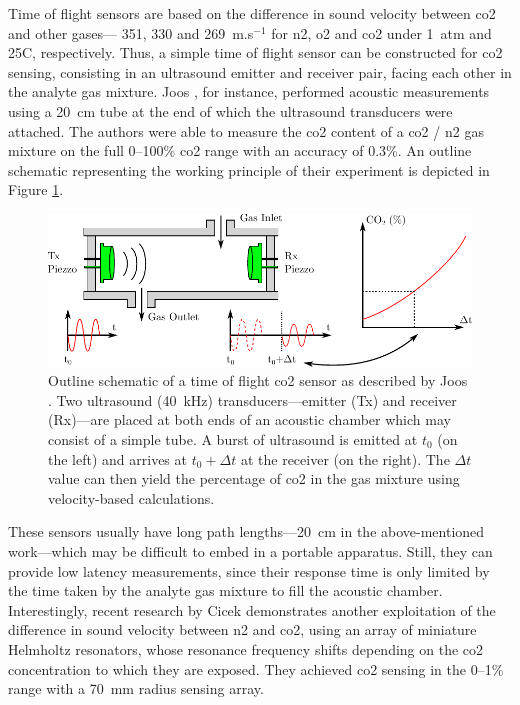 Time of flight sensors are based on the difference in sound velocity between \gls{co2} and other gases---\eg{} 351, 330 and 269~m.s$^{-1}$ for \gls{n2}, \gls{o2} and \gls{co2} under 1~atm and 25{\degree}C, respectively\cite{giacobbe1993}. Thus, a simple time of flight sensor can be constructed for \gls{co2} sensing, consisting in an ultrasound emitter and receiver pair, facing each other in the analyte gas mixture. Joos \etal{}\cite{joos1993}, for instance, performed acoustic measurements using a 20~cm tube at the end of which the ultrasound transducers were attached. The authors were able to measure the \gls{co2} content of a \gls{co2} / \gls{n2} gas mixture on the full 0--100\% \gls{co2} range with an accuracy of 0.3\%. An outline schematic representing the working principle of their experiment is depicted in Figure \ref{fig:choos:review:time_of_flight}.

\begin{figure}
	\centering
	\includegraphics{1_main_matter/choos_figures/review/time_of_flight}
	\caption[Outline schematic of a time of flight \gls{co2} sensor.]{Outline schematic of a time of flight \gls{co2} sensor as described by Joos \etal{}\cite{joos1993}. Two ultrasound (40~kHz) transducers---emitter (Tx) and receiver (Rx)---are placed at both ends of an acoustic chamber which may consist of a simple tube. A burst of ultrasound is emitted at $t_0$ (on the left) and arrives at $t_0+{\Delta}t$ at the receiver (on the right). The ${\Delta}t$ value can then yield the percentage of \gls{co2} in the gas mixture using velocity-based calculations.}
	\label{fig:choos:review:time_of_flight}
\end{figure}

These sensors usually have long path lengths---20~cm in the above-mentioned work\cite{joos1993}---which may be difficult to embed in a portable apparatus. Still, they can provide low latency measurements, since their response time is only limited by the time taken by the analyte gas mixture to fill the acoustic chamber. Interestingly, recent research by Cicek \etal{}\cite{cicek2019} demonstrates another exploitation of the difference in sound velocity between \gls{n2} and \gls{co2}, using an array of miniature Helmholtz resonators, whose resonance frequency shifts depending on the \gls{co2} concentration to which they are exposed. They achieved \gls{co2} sensing in the 0--1\% range with a 70~mm radius sensing array.

